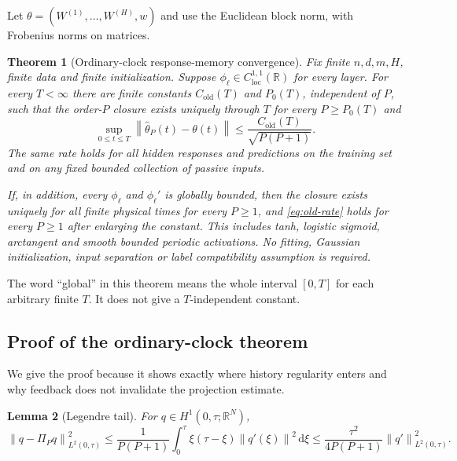 \documentclass[11pt]{article}
\newtheorem{theorem}{Theorem}[section]
\newtheorem{lemma}[theorem]{Lemma}
\theoremstyle{definition}
\theoremstyle{remark}
\newcommand{\R}{\mathbb{R}}
\newcommand{\norm}[1]{\left\lVert #1\right\rVert}
\newcommand{\dd}{\,\mathrm{d}}
\begin{document}
Let $\theta=(W^{(1)},\ldots,W^{(H)},w)$ and use the Euclidean block norm, with
Frobenius norms on matrices.

\begin{theorem}[Ordinary-clock response-memory convergence]
\label{thm:old}
Fix finite $n,d,m,H$, finite data and finite initialization.  Suppose
$\phi_\ell\in C^{1,1}_{\mathrm{loc}}(\R)$ for every layer.  For every
$T<\infty$ there are finite constants $C_{\mathrm{old}}(T)$ and $P_0(T)$,
independent of $P$, such that the order-$P$ closure exists uniquely through
$T$ for every $P\ge P_0(T)$ and
\begin{equation}
 \sup_{0\le t\le T}\norm{\widehat\theta_P(t)-\theta(t)}
 \le \frac{C_{\mathrm{old}}(T)}{\sqrt{P(P+1)}}.       \label{eq:old-rate}
\end{equation}
The same rate holds for all hidden responses and predictions on the training
set and on any fixed bounded collection of passive inputs.

If, in addition, every $\phi_\ell$ and $\phi_\ell'$ is globally bounded, then
the closure exists uniquely for all finite physical times for every $P\ge1$,
and \eqref{eq:old-rate} holds for every $P\ge1$ after enlarging the constant.
This includes tanh, logistic sigmoid, arctangent and smooth bounded periodic
activations.  No fitting, Gaussian initialization, input separation or label
compatibility assumption is required.
\end{theorem}

The word ``global'' in this theorem means the whole interval $[0,T]$ for each
arbitrary finite $T$.  It does not give a $T$-independent constant.

\subsection{Proof of the ordinary-clock theorem}

We give the proof because it shows exactly where history regularity enters and
why feedback does not invalidate the projection estimate.

\begin{lemma}[Legendre tail]
\label{lem:legendre}
For $q\in H^1(0,\tau;\R^N)$,
\begin{equation}
 \norm{q-\Pi_Pq}_{L^2(0,\tau)}^2
 \le\frac{1}{P(P+1)}\int_0^\tau \xi(\tau-\xi)
 \norm{q'(\xi)}^2\dd\xi
 \le\frac{\tau^2}{4P(P+1)}\norm{q'}_{L^2(0,\tau)}^2. \label{eq:leg-tail}
\end{equation}
\end{lemma}
\end{document}
